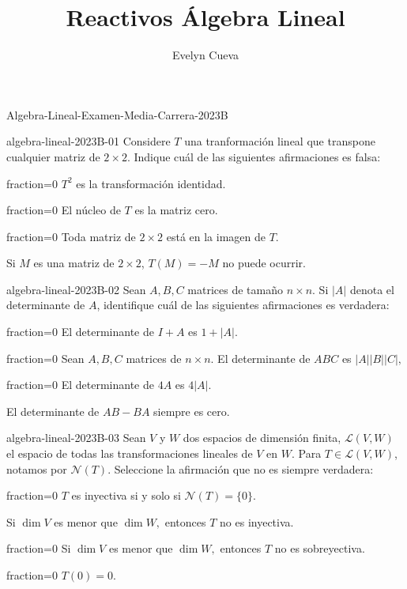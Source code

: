 \documentclass[10pt]{article}
\title{Reactivos Álgebra Lineal}
\author{Evelyn Cueva}
\begin{document}
\maketitle

\begin{quiz}{Algebra-Lineal-Examen-Media-Carrera-2023B}


\begin{multi}{algebra-lineal-2023B-01}
    Considere $T$ una tranformaci\'on lineal que transpone cualquier matriz de $2\times 2.$
    Indique cu\'al de las siguientes afirmaciones es falsa:
    \item[fraction=0] $T^2$ es la transformaci\'on identidad. 
    \item[fraction=0] El n\'ucleo de $T$ es la matriz cero. 
    \item[fraction=0] Toda matriz de $2\times 2$ est\'a en la imagen de $T.$
    \item* Si $M$ es una matriz de $2\times 2$, $T(M)=-M$ no puede ocurrir. 
\end{multi}


\begin{multi}{algebra-lineal-2023B-02}
    Sean $A,B,C$ matrices de tama\~no $n\times n$. Si $|A|$ denota el determinante de $A$, identifique cu\'al de las siguientes afirmaciones es verdadera: 
    \item[fraction=0] El determinante de $I+A$ es $1+|A|.$
    \item[fraction=0] Sean $A,B,C$ matrices de $n\times n$. El determinante de $ABC$ es $|A||B||C|,$ 
    \item[fraction=0] El determinante de $4A$ es $4|A|.$
    \item* El determinante de $AB-BA$ siempre es cero.  
\end{multi}


\begin{multi}{algebra-lineal-2023B-03}
Sean $V$ y $W$ dos espacios de dimensi\'on finita, $\mathcal L(V,W)$ el espacio de todas las transformaciones lineales de $V$ en $W$. Para $T\in\mathcal L(V,W)$, notamos por $\mathcal N(T)$. Seleccione la afirmaci\'on que no es siempre verdadera:
     \item[fraction=0]  $T$ es inyectiva si y solo si $\mathcal N(T)=\{0\}.$
     \item* Si $\dim V$ es menor que $\dim W,$ entonces $T$ no es inyectiva. 
     \item[fraction=0] Si $\dim V$ es menor que $\dim W,$ entonces $T$ no es sobreyectiva. 
     \item[fraction=0] $T(0)=0.$
\end{multi}


\end{quiz}
\end{document}
